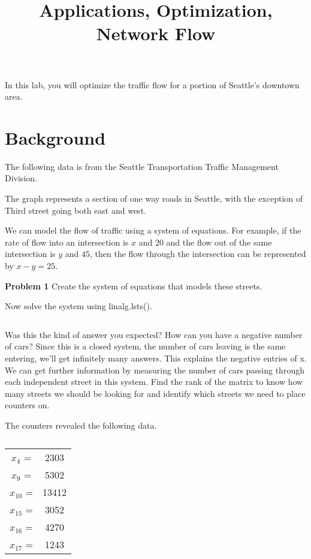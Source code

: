 \documentclass[12pt]{article}
\begin{document}
\title{Applications, Optimization, Network Flow}
In this lab, you will optimize the traffic flow for a portion of Seattle's downtown area.

\section*{Background}

The following data is from the Seattle Transportation Traffic Management Division.

The graph represents a section of one way roads in Seattle, with the exception of Third street going both east and west.
 
We can model the flow of traffic using a system of equations. For example, if the rate of flow into an intersection is $x$ and $20$ and the flow out of the same intersection is $y$ and $45$, then the flow through the intersection can be represented by $x-y = 25$.

 
\textbf{Problem 1} 
Create the system of equations that models these streets.
 
Now solve the system using linalg.lsts(). %
\begin{lstlisting}
\end{lstlisting}

Was this the kind of answer you expected? How can you have a negative number of cars? Since this is a closed system, the number of cars leaving is the same entering, we'll get infinitely many answers.
This explains the negative entries of x.
We can get further information by measuring the number of cars passing through each independent street in this system. Find the rank of the matrix to know how many streets we should be looking for and identify which streets we need to place counters on. 


 
The counters revealed the following data.

\begin{table}[h]
\centering
\begin{tabular}{cc}
 $x_4$ =& 2303\\
 $x_9$ =& 5302\\
 $x_{10}$ =& 13412\\
 $x_{15}$ =& 3052\\
 $x_{16}$ =& 4270\\
 $x_{17}$ =& 1243\\
\end{tabular}
\caption{}
\end{table}
\end{document}
